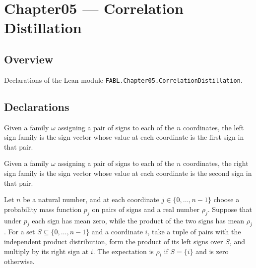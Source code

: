 \chapter{Chapter05 — Correlation Distillation}
\section{Overview}

Declarations of the Lean module \texttt{FABL.Chapter05.CorrelationDistillation}.

\section{Declarations}

\begin{definition}
\label{FABL.signPairFamilyLeft}
\leanok
{}
Given a family $\omega$ assigning a pair of signs to each of the $n$ coordinates, the
left sign family is the sign vector whose value at each coordinate is the first sign in
that pair.
\end{definition}

\begin{definition}
\label{FABL.signPairFamilyRight}
\leanok
{}
Given a family $\omega$ assigning a pair of signs to each of the $n$ coordinates, the
right sign family is the sign vector whose value at each coordinate is the second sign
in that pair.
\end{definition}

\begin{theorem}
\label{FABL.independentSignPair_monomial_right_expectation}
\leanok
{}
Let $n$ be a natural number, and at each coordinate $j\in\{0,\ldots,n-1\}$ choose a
probability mass function $p_j$ on pairs of signs and a real number $\rho_j$. Suppose
that under $p_j$ each sign has mean zero, while the product of the two signs has mean
$\rho_j$. For a set $S\subseteq\{0,\ldots,n-1\}$ and a coordinate $i$, take a tuple of
pairs with the independent product distribution, form the product of its left signs over
$S$, and multiply by its right sign at $i$. The expectation is $\rho_i$ if $S=\{i\}$ and
is zero otherwise.
\end{theorem}

